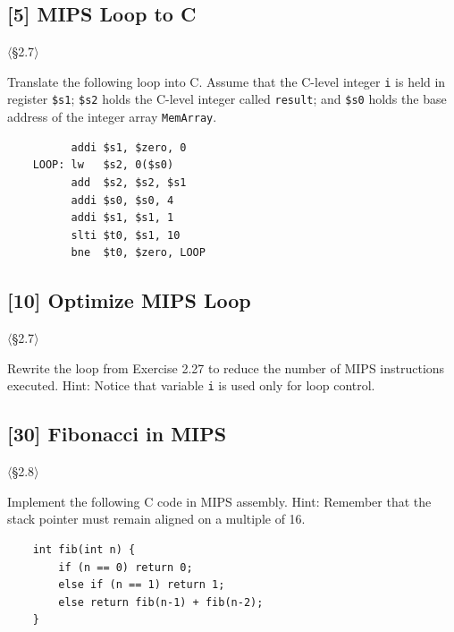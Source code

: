 \problembreak

\subsection{[5] MIPS Loop to C}
\hypertarget{prob-2.27}{}
\noindent$\langle$\S2.7$\rangle$\medskip

\noindent Translate the following loop into C. Assume that the C-level integer
\texttt{i} is held in register \texttt{\$s1}; \texttt{\$s2} holds the C-level
integer called \texttt{result}; and \texttt{\$s0} holds the base address of
the integer array \texttt{MemArray}.
\begin{verbatim}
          addi $s1, $zero, 0
    LOOP: lw   $s2, 0($s0)
          add  $s2, $s2, $s1
          addi $s0, $s0, 4
          addi $s1, $s1, 1
          slti $t0, $s1, 10
          bne  $t0, $zero, LOOP
\end{verbatim}

\problembreak

\subsection{[10] Optimize MIPS Loop}
\hypertarget{prob-2.28}{}
\noindent$\langle$\S2.7$\rangle$\medskip

\noindent Rewrite the loop from Exercise 2.27 to reduce the number of MIPS
instructions executed. Hint: Notice that variable \texttt{i} is used only for
loop control.

\problembreak

\subsection{[30] Fibonacci in MIPS}
\hypertarget{prob-2.29}{}
\noindent$\langle$\S2.8$\rangle$\medskip

\noindent Implement the following C code in MIPS assembly. Hint: Remember that
the stack pointer must remain aligned on a multiple of 16.
\begin{verbatim}
    int fib(int n) {
        if (n == 0) return 0;
        else if (n == 1) return 1;
        else return fib(n-1) + fib(n-2);
    }
\end{verbatim}

\problembreak

